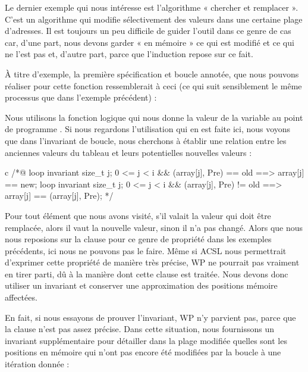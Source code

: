 \label{l4:statements-loops-ex-search-and-replace}


Le dernier exemple qui nous intéresse est l'algorithme « chercher et remplacer ».
C'est un algorithme qui modifie sélectivement des valeurs dans une
certaine plage d'adresses. Il est toujours un peu difficile de guider l'outil
dans ce genre de cas car, d'une part, nous devons garder « en mémoire » ce qui est modifié
et ce qui ne l'est pas et, d'autre part, parce que l'induction repose sur ce fait.


À titre d'exemple, la première spécification et boucle annotée, que nous pouvons
réaliser pour cette fonction ressemblerait à ceci (ce qui suit sensiblement le
même processus que dans l'exemple précédent) :




Nous utilisons la fonction logique  qui
nous donne la valeur de la variable  au point de programme
. Si nous regardons l'utilisation qui en est faite ici, nous
voyons que dans l'invariant de boucle, nous cherchons à établir une relation
entre les anciennes valeurs du tableau et leurs potentielles nouvelles valeurs :


\begin{CodeBlock}{c}
/*@
  loop invariant \forall size_t j; 0 <= j < i && \at(array[j], Pre) == old
                   ==> array[j] == new;
  loop invariant \forall size_t j; 0 <= j < i && \at(array[j], Pre) != old
                   ==> array[j] == \at(array[j], Pre);
*/
\end{CodeBlock}


Pour tout élément que nous avons visité, s'il valait la valeur qui doit être
remplacée, alors il vaut la nouvelle valeur, sinon il n'a pas changé. Alors que
nous nous reposions sur la clause  pour ce genre de propriété
dans les exemples précédents, ici nous ne pouvons pas le faire. Même si ACSL nous
permettrait d'exprimer cette propriété de manière très précise, WP ne pourrait pas
vraiment en tirer parti, dû à la manière dont cette clause est traitée. Nous devons
donc utiliser un invariant et conserver une approximation des positions mémoire
affectées.


En fait, si nous essayons de prouver l'invariant, WP n'y parvient pas, parce que
la clause  n'est pas assez précise. Dans cette situation,
nous fournissons un invariant supplémentaire pour détailler dans la plage modifiée
quelles sont les positions en mémoire qui n'ont pas encore été modifiées par la
boucle à une itération donnée :


